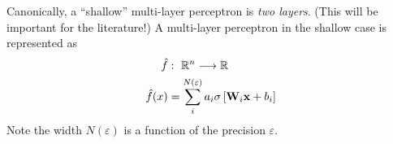 \begin{frame}
\end{frame}

\begin{frame}
    Canonically, a ``shallow'' multi-layer perceptron is \textit{two layers}. (This will be important
    for the literature!)
    A multi-layer perceptron in the shallow case is represented as
    \begin{align*}
        \hat{f} &: ~ \mathbb{R}^n \longrightarrow \mathbb{R} \\
        \hat{f}(x) &=  \sum_i^{N(\varepsilon)} a_i \sigma \left[\mathbf{W}_i \mathbf{x} + b_i \right]
    \end{align*}
    Note the width $N(\varepsilon)$ is a function of the precision $\varepsilon$.
\end{frame}

